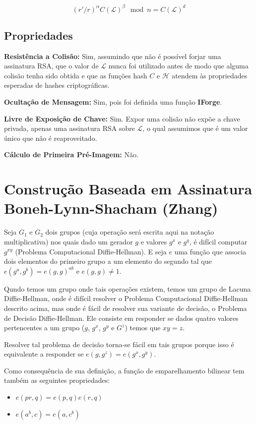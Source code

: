\documentclass[a4paper]{article}
\begin{document}
$$
(r'/r)^\alpha C(\mathcal{L})^{\beta} \mod n= C(\mathcal{L})^d
$$

\subsection{Propriedades}

\textbf{Resistência a Colisão: }Sim, assumindo que não é possível
forjar uma assinatura RSA, que o valor de $\mathcal{L}$ nunca foi
utilizado antes de modo que alguma colisão tenha sido obtida e que as
funções hash $C$ e $\mathcal{H}$ atendem às propriedades esperadas de
hashes criptográficas.

\textbf{Ocultação de Mensagem: }Sim, pois foi definida uma função
\textbf{IForge}.

\textbf{Livre de Exposição de Chave: } Sim. Expor uma colisão não
expõe a chave privada, apenas uma assinatura RSA sobre $\mathcal{L}$,
o qual assumimos que é um valor único que não é reaproveitado.
  
\textbf{Cálculo de Primeira Pré-Imagem: }Não.

\section{Construção Baseada em Assinatura Boneh-Lynn-Shacham (Zhang) \cite{zhang}}

Seja $G_1$ e $G_2$ dois grupos (cuja operação será escrita aqui na
notação multiplicativa) nos quais dado um gerador $g$ e valores $g^x$
e $g^y$, é difícil computar $g^{xy}$ (Problema Computacional
Diffie-Hellman). E seja $e$ uma função que associa dois elementos do
primeiro grupo a um elemento do segundo tal que $e(g^a, g^b) = e(g,
g)^{ab}$ e $e(g, g) \neq 1$.

Qundo temos um grupo onde tais operações existem, temos um grupo de
Lacuna Diffie-Hellman, onde é difícil resolver o Problema
Computacional Diffie-Hellman descrito acima, mas onde é fácil de
resolver sua variante de decisão, o Problema de Decisão
Diffie-Hellman. Ele consiste em responder se dados quatro valores
pertencentes a um grupo ($g$, $g^x$, $g^y$ e $G^z$) temos que $xy=z$.

Resolver tal problema de decisão torna-se fácil em tais grupos porque
isso é equivalente a responder se $e(g, g^z) = e(g^x, g^y)$.

Como consequência de sua definição, a função de emparelhamento
bilinear tem também as seguintes propriedades:

\begin{itemize}
\item$e(pr, q) = e(p, q)e(r, q)$
\item$e(a^b, c) = e(a, c^b)$
\end{itemize}
\end{document}
